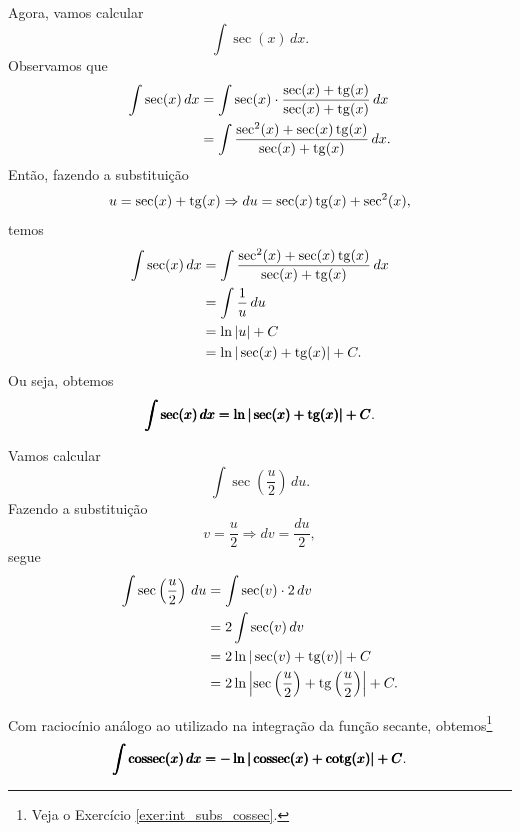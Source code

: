 Agora, vamos calcular
\begin{equation}
  \int \sec(x)\,dx.
\end{equation}
Observamos que
\begin{align}
  \int\sec(x)\,dx &= \int \sec(x)\cdot\frac{\sec(x)+\operatorname{tg}(x)}{\sec(x)+\operatorname{tg}(x)}\,dx \\
                  &= \int \frac{\sec^2(x)+\sec(x)\operatorname{tg}(x)}{\sec(x)+\operatorname{tg}(x)}\,dx.
\end{align}
Então, fazendo a substituição
\begin{equation}
  u = \sec(x) + \operatorname{tg}(x) \Rightarrow du = \sec(x)\operatorname{tg}(x) + \sec^2(x),
\end{equation}
temos
\begin{align}
  \int\sec(x)\,dx &= \int\frac{\sec^2(x)+\sec(x)\operatorname{tg}(x)}{\sec(x)+\operatorname{tg}(x)}\,dx \\
                  &= \int\frac{1}{u}\,du \\
                  &= \ln|u| + C \\
                  &= \ln|\sec(x)+\operatorname{tg}(x)| + C.
\end{align}
Ou seja, obtemos
\begin{equation}
  \pmb{\int\sec(x)\,dx = \ln|\sec(x)+\operatorname{tg}(x)|+C}.
\end{equation}

\begin{ex}
  Vamos calcular
  \begin{equation}
    \int\sec\left(\frac{u}{2}\right)\,du.
  \end{equation}
  Fazendo a substituição
  \begin{equation}
    v = \frac{u}{2} \Rightarrow dv = \frac{du}{2},
  \end{equation}
  segue
  \begin{align}
    \int\sec\left(\frac{u}{2}\right)\,du &= \int\sec(v)\cdot 2\,dv \\
                                         &= 2\int \sec(v)\,dv \\
                                         &= 2\ln|\sec(v)+\operatorname{tg}(v)| + C \\
                                         &= 2\ln\left|\sec\left(\frac{u}{2}\right)+\operatorname{tg}\left(\frac{u}{2}\right)\right| + C.
  \end{align}
\end{ex}

Com raciocínio análogo ao utilizado na integração da função secante, obtemos\footnote{Veja o Exercício \ref{exer:int_subs_cossec}.}
\begin{equation}
  \pmb{\int \operatorname{cossec}(x)\,dx = -\ln|\operatorname{cossec}(x)+\operatorname{cotg}(x)| + C}.
\end{equation}


